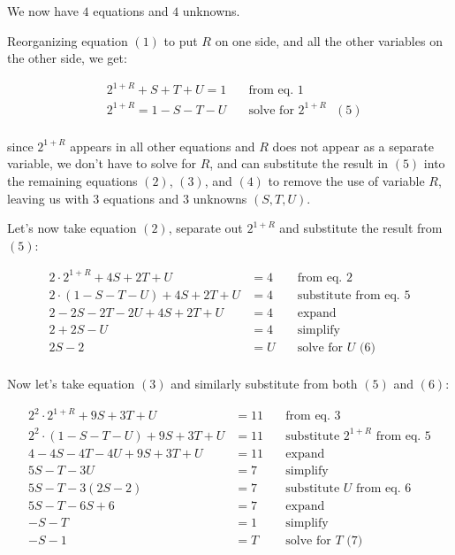 We now have $4$ equations and $4$ unknowns.

Reorganizing equation $(1)$ to put $R$ on one side, and all the other
variables on the other side, we get:

$$
\begin{aligned}
& 2^{1 + R} +   S +  T + U = 1 & \quad \text{from eq. $1$} \\
& 2^{1 + R} = 1 - S - T - U    & \quad \text{solve for $2^{1+R}$ $(5)$} \\
\end{aligned}
$$

since $2^{1+R}$ appears in all other equations and $R$ does not appear as a
separate variable, we don't have to solve for $R$, and can substitute the
result in $(5)$ into the remaining equations $(2)$, $(3)$, and $(4)$ to remove
the use of variable $R$, leaving us with $3$ equations and $3$ unknowns $(S, T,
U)$.

Let's now take equation $(2)$, separate out $2^{1+R}$ and substitute the result
from $(5)$:

$$
\begin{aligned}
2   \cdot 2^{1 + R} +  4S + 2T + U      & = 4 & \quad \text{from eq. 2} \\
2   \cdot (1 - S - T - U) + 4S + 2T + U & = 4 & \quad \text{substitute from eq. 5} \\
2 - 2S - 2T - 2U + 4S + 2T + U          & = 4 & \quad \text{expand} \\
2 + 2S - U                              & = 4 & \quad \text{simplify} \\
2S - 2                                  & = U & \quad \text{solve for $U$ (6)} \\
\end{aligned}
$$

Now let's take equation $(3)$ and similarly substitute from both $(5)$ and $(6)$:

$$
\begin{aligned}
2^2 \cdot 2^{1 + R} +  9S + 3T + U       & = 11 & \quad \text{from eq. 3} \\
2^2 \cdot (1 - S - T - U) + 9S + 3T + U  & = 11 & \quad \text{substitute $2^{1+R}$ from eq. 5} \\
4 - 4S - 4T - 4U + 9S + 3T + U           & = 11 & \quad \text{expand} \\
5S - T - 3U                              & = 7  & \quad \text{simplify} \\
5S - T - 3(2S - 2)                       & = 7  & \quad \text{substitute $U$ from eq. 6} \\
5S - T - 6S + 6                          & = 7  & \quad \text{expand} \\
-S - T                                   & = 1  & \quad \text{simplify} \\
-S - 1                                   & = T  & \quad \text{solve for $T$ (7)} \\
\end{aligned}
$$

